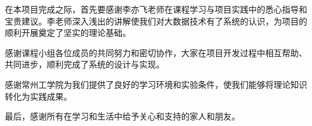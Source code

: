 \begin{acknowledgements}
  在本项目完成之际，首先要感谢李亦飞老师在课程学习与项目实践中的悉心指导和宝贵建议。李老师深入浅出的讲解使我们对大数据技术有了系统的认识，为项目的顺利开展奠定了坚实的理论基础。

  感谢课程小组各位成员的共同努力和密切协作，大家在项目开发过程中相互帮助、共同进步，顺利完成了系统的设计与实现。

  感谢常州工学院为我们提供了良好的学习环境和实验条件，使我们能够将理论知识转化为实践成果。

  最后，感谢所有在学习和生活中给予关心和支持的家人和朋友。
\end{acknowledgements}
